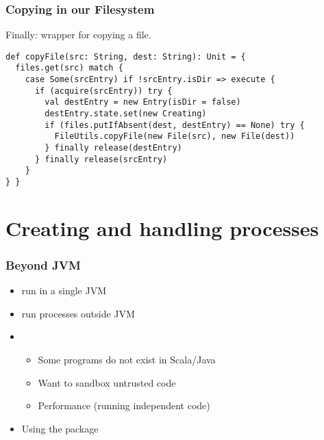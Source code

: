 \documentclass[aspectratio=169]{beamer}
\begin{document}
\begin{frame}[fragile]\frametitle{Copying in our Filesystem}
    Finally: wrapper for copying a file.

\begin{lstlisting}[emph={execute,sleep,log,Copying,copyFile,acquire, release}]
def copyFile(src: String, dest: String): Unit = {
  files.get(src) match {
    case Some(srcEntry) if !srcEntry.isDir => execute {
      if (acquire(srcEntry)) try {
        val destEntry = new Entry(isDir = false)
        destEntry.state.set(new Creating)
        if (files.putIfAbsent(dest, destEntry) == None) try {
          FileUtils.copyFile(new File(src), new File(dest))
        } finally release(destEntry)
      } finally release(srcEntry)
    }
} }
\end{lstlisting}
\end{frame}



\section{Creating and handling processes}

\begin{frame}\frametitle{Beyond JVM}

\begin{itemize}
  \item {} run in a single JVM
  \item {} run processes outside JVM
  \item {}
  \pause
    \begin{itemize}
      \item Some programs do not exist in Scala/Java
      \item \pause Want to sandbox untrusted code
      \item \pause Performance (running independent code)
    \end{itemize}
  \pause
  \item Using the \alert{} package
\end{itemize}
\end{frame}
\end{document}
